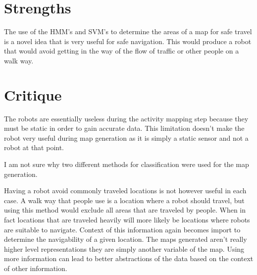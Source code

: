 \documentclass{article}
\begin{document}
\section*{Strengths}
The use of the HMM's and SVM's to determine the areas of a map for safe travel is a novel idea that is very useful for safe navigation. This would produce a robot that would avoid getting in the way of the flow of traffic or other people on a walk way.
\section*{Critique}
The robots are essentially useless during the activity mapping step because they must be static in order to gain accurate data. This limitation doesn't make the robot very useful during map generation as it is simply a static sensor and not a robot at that point.

I am not sure why two different methods for classification were used for the map generation.

Having a robot avoid commonly traveled locations is not however useful in each case. A walk way that people use is a location where a robot should travel, but using this method would exclude all areas that are traveled by people. When in fact locations that are traveled heavily will more likely be locations where robots are suitable to navigate. Context of this information again becomes import to determine the navigability of a given location. The maps generated aren't really higher level representations they are simply another variable of the map. Using more information can lead to better abstractions of the data based on the context of other information.
\cite{4468719}
\end{document}
